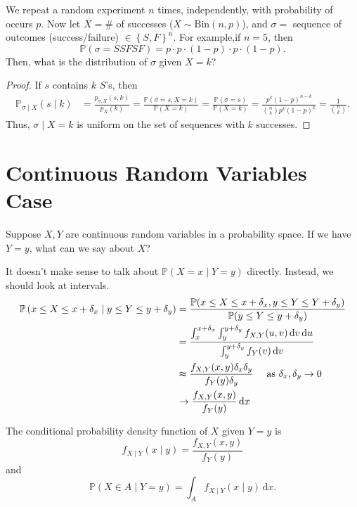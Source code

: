 \begin{eg}
    We repeat a random experiment \(n\) times, independently, with probability of occurs \(p\). Now let \(X = \#\) of successes (\(X \sim \mathrm{Bin}(n, p) \)), and \(\sigma =\) sequence of outcomes (success/failure) \( \in \left\{ S, F \right\}^n \). For example,if \(n = 5\), then  
    \[
        \mathbb{P} (\sigma = SSFSF) = p \cdot p \cdot (1 - p) \cdot p \cdot (1 - p).
    \]      
    Then, what is the distribution of \(\sigma\) given \(X = k\)?  
\end{eg}

\begin{proof}
    If \(s\) contains \(k\) \(S\)'s, then    
    \begin{align*}
        \mathbb{P} _{\sigma \mid X}(s \mid k) &= \frac{p_{\sigma , X}(s, k)}{p_X(k)} = \frac{\mathbb{P} (\sigma = s, X = k)}{\mathbb{P} (X = k)} = \frac{\mathbb{P} (\sigma = s)}{\mathbb{P} (X = k)} = \frac{p^k (1 - p)^{n - k}}{\binom{n}{k} p^k (1 - p)^k} = \frac{1}{\binom{n}{k}}.
    \end{align*}
    Thus, \(\sigma \mid X = k\) is uniform on the set of sequences with \(k\) successes.  
\end{proof}

\section{Continuous Random Variables Case}
Suppose \(X, Y\) are continuous random variables in a probability space. If we have \(Y = y\), what can we say about \(X\)?

It doesn't make sense to talk about \(\mathbb{P} (X = x \mid Y = y)\) directly. Instead, we should look at intervals. 
\begin{align*}
    \mathbb{P} \left( x \le X \le x + \delta _x \mid y \le Y \le y + \delta _y \right) &= \frac{\mathbb{P} (x \le X \le x + \delta _x, y \le Y \le Y + \delta _y)}{\mathbb{P} (y \le Y \le y + \delta _y)} \\
    &= \frac{\int _x^{x + \delta _x} \int _y^{y + \delta _y} f_{X, Y}(u, v) \, \mathrm{d} v \, \mathrm{d} u  }{\int _y^{y + \delta _y} f_Y(v) \, \mathrm{d} v } \\
    &\thickapprox \frac{f_{X, Y}(x,y) \delta _x \delta _y}{f_Y(y) \delta _y} \quad \text{ as } \delta _x, \delta _y \to 0  \\
    &\to \frac{f_{X, Y}(x, y)}{f_Y(y)} \, \mathrm{d} x  
\end{align*} 

\begin{definition}
    The conditional probability density function of \(X\) given \(Y = y\) is 
    \[
        f_{X \mid Y}(x \mid y) = \frac{f_{X, Y}(x, y)}{f_Y(y)}
    \]  and 
    \[
        \mathbb{P} (X \in A \mid Y = y) = \int _A f_{X \mid Y}(x \mid y) \, \mathrm{d} x. 
    \]
\end{definition}

